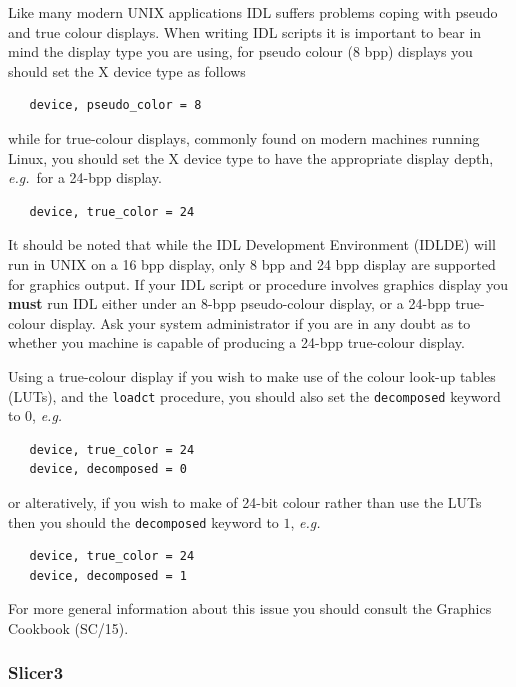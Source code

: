 \documentclass[twoside,11pt]{article}
\newcommand{\xref}[3]{#1}
\begin{document}
{Like many modern UNIX applications IDL suffers problems coping with
pseudo and true colour displays.  When writing IDL scripts it is
important to bear in mind the display type you are using, for pseudo
colour (8 bpp) displays you should set the X device type as follows

\small\begin{verbatim}
   device, pseudo_color = 8
\end{verbatim}\normalsize

while for true-colour displays, commonly found on modern machines
running Linux, you should set the X device type to have the
appropriate display depth, \emph{e.g.}\ for a 24-bpp display.

\small\begin{verbatim}
   device, true_color = 24
\end{verbatim}\normalsize

It should be noted that while the IDL Development Environment (IDLDE)
will run in UNIX on a 16 bpp display, only 8 bpp and 24 bpp display
are supported for graphics output.  If your IDL script or procedure
involves graphics display you {\bf must} run IDL either under an 8-bpp
pseudo-colour display, or a 24-bpp true-colour display.  Ask your
system administrator if you are in any doubt as to whether you machine
is capable of producing a 24-bpp true-colour display.

Using a true-colour display if you wish to make use of the colour
look-up tables (LUTs), and the {\tt loadct} procedure, you should also
set the {\tt decomposed} keyword to $0$, \emph{e.g.}\

\small\begin{verbatim}
   device, true_color = 24
   device, decomposed = 0
\end{verbatim}\normalsize

or alteratively, if you wish to make of 24-bit colour rather than use
the LUTs then you should the {\tt decomposed} keyword to $1$,
\emph{e.g.}\

\small\begin{verbatim}
   device, true_color = 24
   device, decomposed = 1
\end{verbatim}\normalsize

For more general information about this issue you should consult the
\xref{Graphics Cookbook}{sc15}{sc15_display} (SC/15).

\subsubsection{Slicer3}

}
\end{document}
